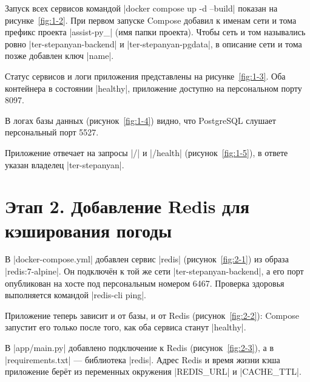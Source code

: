 Запуск всех сервисов командой \cmd|docker compose up -d --build|
показан на рисунке~\ref{fig:1-2}. При первом запуске Compose добавил к
именам сети и тома префикс проекта \cmd|assist-py_| (имя папки
проекта). Чтобы сеть и том назывались ровно
\cmd|ter-stepanyan-backend| и \cmd|ter-stepanyan-pgdata|, в
описание сети и тома позже добавлен ключ \cmd|name|.


Статус сервисов и логи приложения представлены на
рисунке~\ref{fig:1-3}. Оба контейнера в состоянии \cmd|healthy|,
приложение доступно на персональном порту 8097.


В логах базы данных (рисунок~\ref{fig:1-4}) видно, что PostgreSQL
слушает персональный порт 5527.


Приложение отвечает на запросы \cmd|/| и \cmd|/health|
(рисунок~\ref{fig:1-5}), в ответе указан владелец
\cmd|ter-stepanyan|.


\section{Этап 2. Добавление Redis для кэширования погоды}

В \cmd|docker-compose.yml| добавлен сервис \cmd|redis|
(рисунок~\ref{fig:2-1}) из образа \cmd|redis:7-alpine|. Он подключён к
той же сети \cmd|ter-stepanyan-backend|, а его порт опубликован на хосте
под персональным номером 6467. Проверка здоровья выполняется командой
\cmd|redis-cli ping|.


Приложение теперь зависит и от базы, и от Redis
(рисунок~\ref{fig:2-2}): Compose запустит его только после того, как оба
сервиса станут \cmd|healthy|.


В \cmd|app/main.py| добавлено подключение к Redis
(рисунок~\ref{fig:2-3}), а в \cmd|requirements.txt| --- библиотека
\cmd|redis|. Адрес Redis и время жизни кэша приложение берёт из
переменных окружения \cmd|REDIS_URL| и \cmd|CACHE_TTL|.


